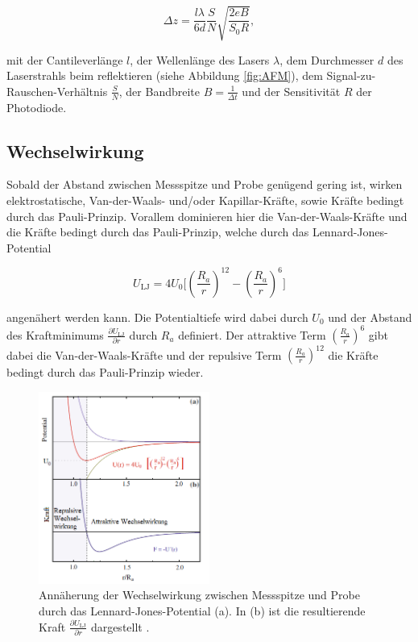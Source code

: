 \begin{equation}
  \Delta z = \frac{l \lambda}{6 d} \frac{S}{N} \sqrt{\frac{2eB}{S_0 R}},
  \label{eq:F3}
\end{equation}

\noindent
mit der Cantileverlänge $l$, der Wellenlänge des Lasers $\lambda$, dem Durchmesser
$d$ des Laserstrahls beim reflektieren (siehe Abbildung \ref{fig:AFM}),
dem Signal-zu-Rauschen-Verhältnis $\frac{S}{N}$, der Bandbreite
$B=\frac{1}{\Delta t}$ und der Sensitivität $R$ der Photodiode.

\subsection{Wechselwirkung}
\label{sec:Wechselwirkung}

Sobald der Abstand zwischen Messspitze und Probe genügend gering ist, wirken
elektrosta{\-}tische, Van-der-Waals- und/oder Kapillar-Kräfte, sowie Kräfte bedingt
durch das Pauli-Prinzip. Vorallem dominieren hier die Van-der-Waals-Kräfte und die
Kräfte bedingt durch das Pauli-Prinzip, welche durch das Lennard-Jones-Potential

\begin{equation}
	U_{\text{LJ}} = 4U_0 \biggl[
		\left(\frac{R_a}{r}\right)^{12} - \left(\frac{R_a}{r}\right)^6
	\biggr]
	\label{eg:F4}
\end{equation}

\noindent
angenähert werden kann. Die Potentialtiefe wird dabei durch $U_0$
und der Abstand des Kraftminimums $\frac{\partial U_{\text{LJ}}}{\partial r}$
durch $R_a$ definiert. Der attraktive Term $\left(\frac{R_a}{r}\right)^6$
gibt dabei die Van-der-Waals-Kräfte und der repulsive Term
$\left(\frac{R_a}{r}\right)^{12}$ die Kräfte bedingt durch das Pauli-Prinzip
wieder.

\begin{figure}[H]
	\centering
	\includegraphics[width=0.5\textwidth]{Abb/LJ.png}
	\caption{Annäherung der Wechselwirkung zwischen Messspitze und Probe durch
	das Lennard-Jones-Potential (a). In (b) ist die resultierende Kraft
	$\frac{\partial U_{\text{LJ}}}{\partial r}$ dargestellt \cite[148]{AFM}.}
	\label{fig:LJ}
\end{figure}

